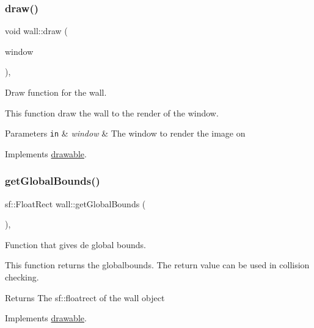 \subsubsection{\texorpdfstring{draw()}{draw()}}
{\footnotesize\ttfamily void wall\+::draw (\begin{DoxyParamCaption}\item[{sf\+::\+Render\+Window \&}]{window }\end{DoxyParamCaption})\hspace{0.3cm}{\ttfamily [override]}, {\ttfamily [virtual]}}



Draw function for the wall. 

This function draw the wall to the render of the window.


\begin{DoxyParams}[1]{Parameters}
\mbox{\tt in}  & {\em window} & The window to render the image on \\
\hline
\end{DoxyParams}


Implements \hyperlink{classdrawable_a4e49e2c1121704c83ce24c5f48dd910f}{drawable}.

\mbox{\label{classwall_a317a464c879cfdf9464bd6f1b62d9101}} 
\subsubsection{\texorpdfstring{get\+Global\+Bounds()}{getGlobalBounds()}}
{\footnotesize\ttfamily sf\+::\+Float\+Rect wall\+::get\+Global\+Bounds (\begin{DoxyParamCaption}{ }\end{DoxyParamCaption})\hspace{0.3cm}{\ttfamily [override]}, {\ttfamily [virtual]}}



Function that gives de global bounds. 

This function returns the globalbounds. The return value can be used in collision checking.

\begin{DoxyReturn}{Returns}
The sf\+::floatrect of the wall object 
\end{DoxyReturn}


Implements \hyperlink{classdrawable_ae013ac0be47538be9ce885d6642daf73}{drawable}.

